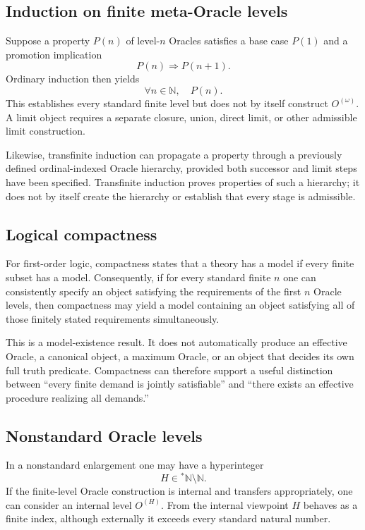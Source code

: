 \documentclass[11pt]{article}
\newcommand{\N}{\mathbb{N}}
\begin{document}
\subsection{Induction on finite meta-Oracle levels}
Suppose a property $P(n)$ of level-$n$ Oracles satisfies a base case $P(1)$ and a promotion implication
\[
P(n)\Longrightarrow P(n+1).
\]
Ordinary induction then yields
\[
\forall n\in\N,\quad P(n).
\]
This establishes every standard finite level but does not by itself construct $O^{(\omega)}$. A limit object requires a separate closure, union, direct limit, or other admissible limit construction.

Likewise, transfinite induction can propagate a property through a previously defined ordinal-indexed Oracle hierarchy, provided both successor and limit steps have been specified. Transfinite induction proves properties of such a hierarchy; it does not by itself create the hierarchy or establish that every stage is admissible.

\subsection{Logical compactness}
For first-order logic, compactness states that a theory has a model if every finite subset has a model. Consequently, if for every standard finite $n$ one can consistently specify an object satisfying the requirements of the first $n$ Oracle levels, then compactness may yield a model containing an object satisfying all of those finitely stated requirements simultaneously.

This is a model-existence result. It does not automatically produce an effective Oracle, a canonical object, a maximum Oracle, or an object that decides its own full truth predicate. Compactness can therefore support a useful distinction between ``every finite demand is jointly satisfiable'' and ``there exists an effective procedure realizing all demands.''

\subsection{Nonstandard Oracle levels}
In a nonstandard enlargement one may have a hyperinteger
\[
H\in{}^*\N\setminus\N.
\]
If the finite-level Oracle construction is internal and transfers appropriately, one can consider an internal level $O^{(H)}$. From the internal viewpoint $H$ behaves as a finite index, although externally it exceeds every standard natural number.
\end{document}
